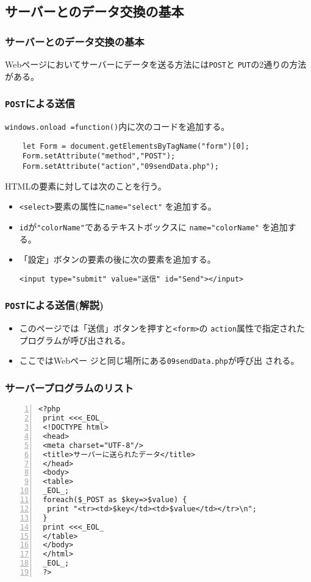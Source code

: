  \subsection{サーバーとのデータ交換の基本}
 \begin{frame}[containsverbatim]
 \frametitle{サーバーとのデータ交換の基本}
 Webページにおいてサーバーにデータを送る方法には\texttt{POST}と
 \texttt{PUT}の2通りの方法がある。
 \end{frame}
 \begin{frame}[containsverbatim]
 \frametitle{\texttt{POST}による送信}
 \texttt{windows.onload =function()}内に次のコードを追加する。
 \begin{Verbatim}
    let Form = document.getElementsByTagName("form")[0];
    Form.setAttribute("method","POST");
    Form.setAttribute("action","09sendData.php");
 \end{Verbatim}
 HTMLの要素に対しては次のことを行う。
 \begin{itemize}
 \item \texttt{<select>}要素の属性に\verb+name="select"+ を追加する。
 \item \texttt{id}が\verb+"colorName"+であるテキストボックスに
       \verb+name="colorName"+ を追加する。
 \item 「設定」ボタンの要素の後に次の要素を追加する。
 \begin{center}
 \verb+<input type="submit" value="送信" id="Send"></input>+ 
 \end{center}
 \end{itemize}
 \end{frame}
 \begin{frame}[containsverbatim]
 \frametitle{\texttt{POST}による送信(解説)}
 \begin{itemize}
 \item このページでは「送信」ボタンを押すと\texttt{<form>}の
 \texttt{action}属性で指定されたプログラムが呼び出される。
 \item ここではWebペー ジと同じ場所にある\texttt{09sendData.php}が呼び出
      される。
 \end{itemize}
 \end{frame}
 \begin{frame}[containsverbatim]
 \frametitle{サーバープログラムのリスト}
 \begin{Verbatim}[numbers=left,fontsize=\footnotesize]
 <?php
 print <<<_EOL_
 <!DOCTYPE html>
 <head>
 <meta charset="UTF-8"/>
 <title>サーバーに送られたデータ</title>
 </head>
 <body>
 <table>
 _EOL_;
 foreach($_POST as $key=>$value) {
  print "<tr><td>$key</td><td>$value</td></tr>\n";
 }
 print <<<_EOL_
 </table>
 </body>
 </html>
 _EOL_;
 ?>
 \end{Verbatim}
 \end{frame}
